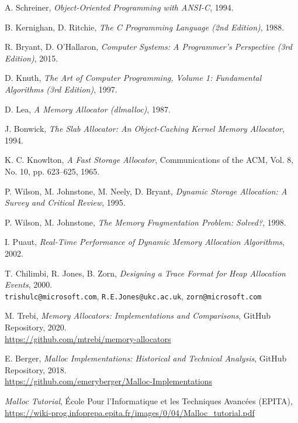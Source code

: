 \begin{thebibliography}{9}

  A. Schreiner, \emph{Object-Oriented Programming with ANSI-C}, 1994.

  B. Kernighan, D. Ritchie, \emph{The C Programming Language (2nd Edition)}, 1988.

  R. Bryant, D. O’Hallaron, \emph{Computer Systems: A Programmer’s Perspective (3rd Edition)}, 2015.

  D. Knuth, \emph{The Art of Computer Programming, Volume 1: Fundamental Algorithms (3rd Edition)}, 1997.

  D. Lea, \emph{A Memory Allocator (dlmalloc)}, 1987.

  J. Bonwick, \emph{The Slab Allocator: An Object-Caching Kernel Memory Allocator}, 1994.

    K. C. Knowlton, \emph{A Fast Storage Allocator}, Communications of the ACM, Vol. 8, No. 10, pp. 623–625, 1965.

  P. Wilson, M. Johnstone, M. Neely, D. Bryant, \emph{Dynamic Storage Allocation: A Survey and Critical Review}, 1995.

  P. Wilson, M. Johnstone, \emph{The Memory Fragmentation Problem: Solved?}, 1998.

  I. Puaut, \emph{Real-Time Performance of Dynamic Memory Allocation Algorithms}, 2002.

  T. Chilimbi, R. Jones, B. Zorn, \emph{Designing a Trace Format for Heap Allocation Events}, 2000. \\
  \texttt{trishulc@microsoft.com}, \texttt{R.E.Jones@ukc.ac.uk}, \texttt{zorn@microsoft.com}

  M. Trebi, \emph{Memory Allocators: Implementations and Comparisons}, GitHub Repository, 2020. \\
  \url{https://github.com/mtrebi/memory-allocators}

  E. Berger, \emph{Malloc Implementations: Historical and Technical Analysis}, GitHub Repository, 2018. \\
  \url{https://github.com/emeryberger/Malloc-Implementations}

  \emph{Malloc Tutorial}, École Pour l'Informatique et les Techniques Avancées (EPITA), \\
  \url{https://wiki-prog.infoprepa.epita.fr/images/0/04/Malloc_tutorial.pdf}


\end{thebibliography}

